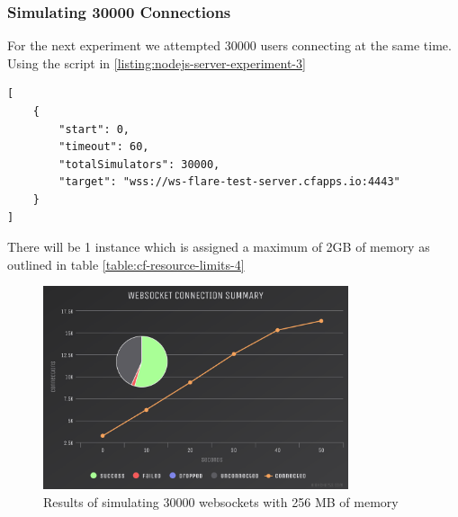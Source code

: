\subsubsection{Simulating 30000 Connections}

For the next experiment we attempted 30000 users connecting at the same time. Using the script in \ref{listing:nodejs-server-experiment-3}

\begin{listing}[H]
    \caption{WS-Flare test script for 5000 users}
    \label{listing:nodejs-server-experiment-3}
    \begin{verbatim}
[
    {
        "start": 0,
        "timeout": 60,
        "totalSimulators": 30000,
        "target": "wss://ws-flare-test-server.cfapps.io:4443"
    }
]
\end{verbatim}
\end{listing}

There will be 1 instance which is assigned a maximum of 2GB of memory as outlined in table \ref{table:cf-resource-limits-4}

\begin{table}[H]
\caption{Cloud Foundry Resource Limits}
\label{table:cf-resource-limits-4}
\end{table}

\begin{figure}[H]
  \centering
    \includegraphics[width=0.8\textwidth]{figures/experiments/experiment-1/node-js/conn-summary-30000-256-memory.png}
    \caption{Results of simulating 30000 websockets with 256 MB of memory}
    \label{fig:experiment-3-conn-summary-5000-1-instances-256-mem}
\end{figure}

